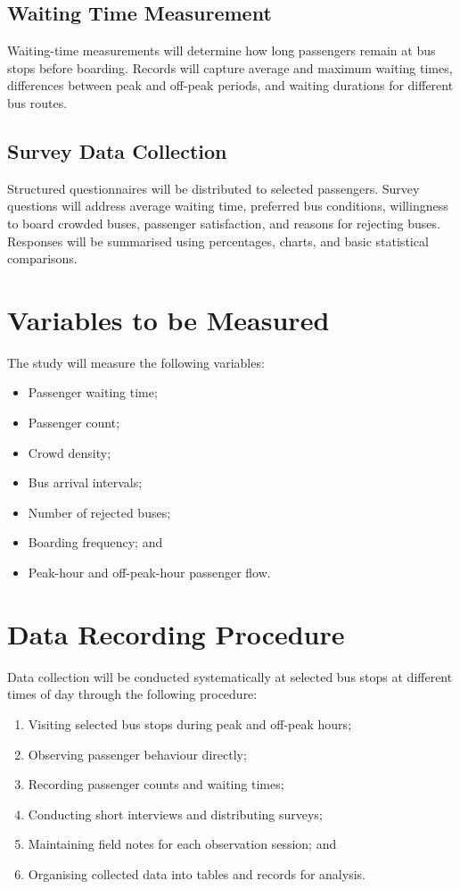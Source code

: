 \documentclass[12pt, a4paper]{report}
\begin{document}
\subsection{Waiting Time Measurement}

Waiting-time measurements will determine how long passengers remain at bus stops before
boarding. Records will capture average and maximum waiting times, differences between
peak and off-peak periods, and waiting durations for different bus routes.

\subsection{Survey Data Collection}

Structured questionnaires will be distributed to selected passengers. Survey questions will
address average waiting time, preferred bus conditions, willingness to board crowded buses,
passenger satisfaction, and reasons for rejecting buses. Responses will be summarised
using percentages, charts, and basic statistical comparisons.

\section{Variables to be Measured}

The study will measure the following variables:

\begin{itemize}[noitemsep]
    \item Passenger waiting time;
    \item Passenger count;
    \item Crowd density;
    \item Bus arrival intervals;
    \item Number of rejected buses;
    \item Boarding frequency; and
    \item Peak-hour and off-peak-hour passenger flow.
\end{itemize}

\section{Data Recording Procedure}

Data collection will be conducted systematically at selected bus stops at different times of
day through the following procedure:

\begin{enumerate}[noitemsep]
    \item Visiting selected bus stops during peak and off-peak hours;
    \item Observing passenger behaviour directly;
    \item Recording passenger counts and waiting times;
    \item Conducting short interviews and distributing surveys;
    \item Maintaining field notes for each observation session; and
    \item Organising collected data into tables and records for analysis.
\end{enumerate}
\end{document}
